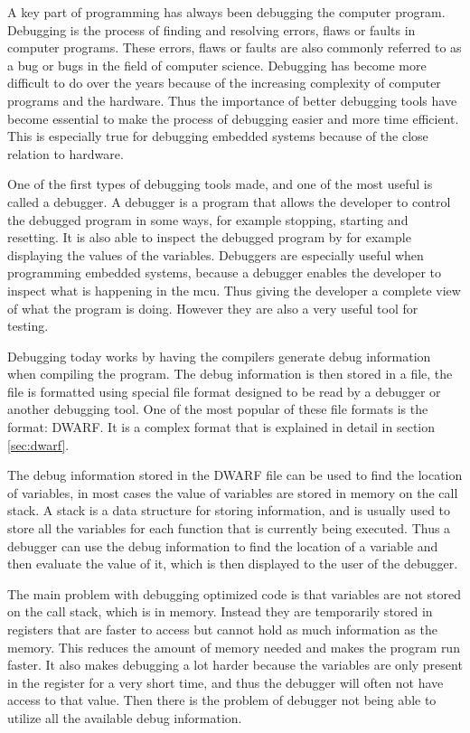 
A key part of programming has always been debugging the computer program.
Debugging is the process of finding and resolving errors, flaws or faults in computer programs.
These errors, flaws or faults are also commonly referred to as a bug or bugs in the field of computer science.
Debugging has become more difficult to do over the years because of the increasing complexity of computer programs and the hardware.
Thus the importance of better debugging tools have become essential to make the process of debugging easier and more time efficient.
This is especially true for debugging  embedded systems because of the close relation to hardware.


One of the first types of debugging tools made, and one of the most useful is called a debugger.
A debugger is a program that allows the developer to control the debugged program in some ways, for example stopping, starting and resetting.
It is also able to inspect the debugged program by for example displaying the values of the variables.
Debuggers are especially useful when programming embedded systems, because a debugger enables the developer to inspect what is happening in the \gls{mcu}.
Thus giving the developer a complete view of what the program is doing.
However they are also a very useful tool for testing.


Debugging today works by having the compilers generate debug information when compiling the program.
The debug information is then stored in a file, the file is formatted using special file format designed to be read by a debugger or another debugging tool.
One of the most popular of these file formats is the format: \gls{DWARF}.
It is a complex format that is explained in detail in section \ref{sec:dwarf}.


The debug information stored in the \gls{DWARF} file can be used to find the location of variables, in most cases the value of variables are stored in memory on the call stack.
A stack is a data structure for storing information, and is usually used to store all the variables for each function that is currently being executed.
Thus a debugger can use the debug information to find the location of a variable and then evaluate the value of it, which is then displayed to the user of the debugger.


The main problem with debugging optimized code is that variables are not stored on the call stack, which is in memory.
Instead they are temporarily stored in registers that are faster to access but cannot hold as much information as the memory.
This reduces the amount of memory needed and makes the program run faster.
It also makes debugging a lot harder because the variables are only present in the register for a very short time, and thus the debugger will often not have access to that value.
Then there is the problem of debugger not being able to utilize all the available debug information.



